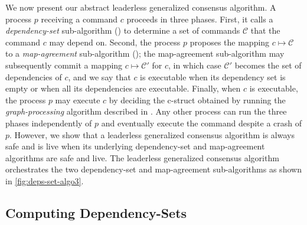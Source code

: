 We now present our abstract leaderless generalized consensus algorithm.
A process $p$ receiving a command $c$ proceeds in three phases. First, it calls a \textit{dependency-set} sub-algorithm () to determine a set of commands $\mathcal{C}$ that the command $c$ may depend on. Second, the process $p$ proposes the mapping  $c\mapsto \mathcal{C}$ to a \textit{map-agreement} sub-algorithm (); the map-agreement sub-algorithm may subsequently commit a mapping $c\mapsto \mathcal{C}'$ for $c$, in which case $\mathcal{C}'$ becomes the set of dependencies of $c$, and we say that $c$ is executable when its dependency set is empty or when all its dependencies are executable. 
Finally, when $c$ is executable, the process $p$ may execute $c$ by deciding the c-struct obtained by running the \emph{graph-processing} algorithm described in .
Any other process can run the three phases independently of $p$ and eventually execute the command despite a crash of $p$.
However, we show that a leaderless  generalized consensus algorithm is always safe and is live when its underlying dependency-set and map-agreement algorithms are safe and live.
The leaderless generalized consensus algorithm orchestrates the two dependency-set and map-agreement sub-algorithms as shown in \cref{fig:deps-set-algo3}.



\subsection{Computing Dependency-Sets}
\label{dep-algo}


